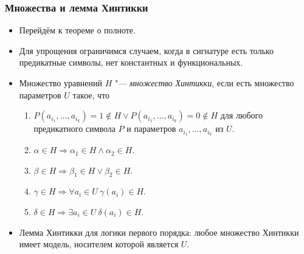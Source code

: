 \documentclass[10pt]{beamer}
\begin{document}
\begin{frame}
    \frametitle{Множества и лемма Хинтикки}
    \begin{itemize}
        \item Перейдём к теореме о полноте.
        \item Для упрощения ограничимся случаем, когда в сигнатуре есть только предикатные символы, нет константных и функциональных.
        \pause
        \item Множество уравнений $H$ "--- \emph{множество Хинтикки}, если есть множество параметров $U$ такое, что
        \begin{enumerate}
            \item $P(a_{i_1},\ldots,a_{i_k})=1 \notin H \lor P(a_{i_1},\ldots,a_{i_k})=0 \notin H$ для любого предикатного символа $P$ и параметров $a_{i_1},\ldots,a_{i_k}$ из $U$.
            \item $\alpha \in H \Rightarrow \alpha_1 \in H \land \alpha_2 \in H$.
            \item $\beta \in H \Rightarrow \beta_1 \in H \lor \beta_2 \in H$.
            \item $\gamma \in H \Rightarrow \forall a_i \in U ~ \gamma(a_i) \in H$.
            \item $\delta \in H \Rightarrow \exists a_i \in U ~ \delta(a_i) \in H$.
        \end{enumerate}
        \pause
        \item Лемма Хинтикки для логики первого порядка: любое множество Хинтикки имеет модель, носителем которой является $U$.
    \end{itemize}
\end{frame}
\end{document}
